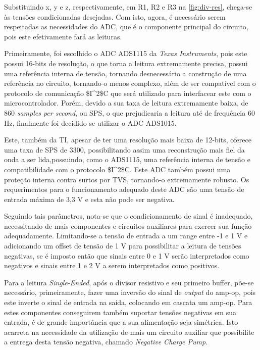 Substituindo x, y e z, respectivamente, em R1, R2 e R3 na \autoref{fig:div-res}, chega-se às tensões condicionadas desejadas. Com isto, agora, é necessário serem respeitadas as necessidades do \gls{ADC}, que é o componente principal do circuito, pois este efetivamente fará as leituras.

Primeiramente, foi escolhido o \gls{ADC} ADS1115 da \textit{Texas Instruments}, pois este possui 16-bits de resolução, o que torna a leitura extremamente precisa, possui uma referência interna de tensão, tornando desnecessário a construção de uma referência no circuito, tornando-o menos complexo, além de ser compatível com o protocolo de comunicação \gls{$I^2$C} que será utilizado para interfacear este com o microcontrolador. Porém, devido a sua taxa de leitura extremamente baixa, de 860 \textit{samples per second}, ou \gls{SPS}, o que prejudicaria a leitura até de frequência 60 Hz, finalmente foi decidido se utilizar o \gls{ADC} ADS1015.

Este, também da \gls{TI}, apesar de ter uma resolução mais baixa de 12-bits, oferece uma taxa de \gls{SPS} de 3300, possibilitando assim uma reconstrução mais fiel da onda a ser lida,possuindo, como o ADS1115, uma referência interna de tensão e compatibilidade com o protocolo \gls{$I^2$C}. Este \gls{ADC} também possui uma proteção interna contra surtos por \gls{TVS}, tornando-o extremamente robusto. Os requerimentos para o funcionamento adequado deste \gls{ADC} são uma tensão de entrada máxima de 3,3 V e esta não pode ser negativa.

Seguindo tais parâmetros, nota-se que o condicionamento de sinal é inadequado, necessitando de mais componentes e circuitos auxiliares para exercer sua função adequadamente. Limitando-se a tensão de entrada a um range entre -1 e 1 V e adicionando um offset de tensão de 1 V para possibilitar a leitura de tensões negativas, se é imposto então que sinais entre 0 e 1 V serão interpretados como negativos e sinais entre 1 e 2 V a serem interpretados como positivos.

Para a leitura \textit{Single-Ended}, após o divisor resistivo e seu primeiro buffer, põe-se necessário, primeiramente, fazer uma inversão do sinal de \textit{output} do \gls{amp-op}, pois este inverte o sinal de entrada na saída, colocando em cascata um \gls{amp-op}. Para estes componentes conseguirem também suportar tensões negativas em sua entrada, é de grande importância que a sua alimentação seja simétrica. Isto acarreta na necessidade da utilização de mais um circuito auxiliar que possibilite a entrega desta tensão negativa, chamado \textit{Negative Charge Pump}.

